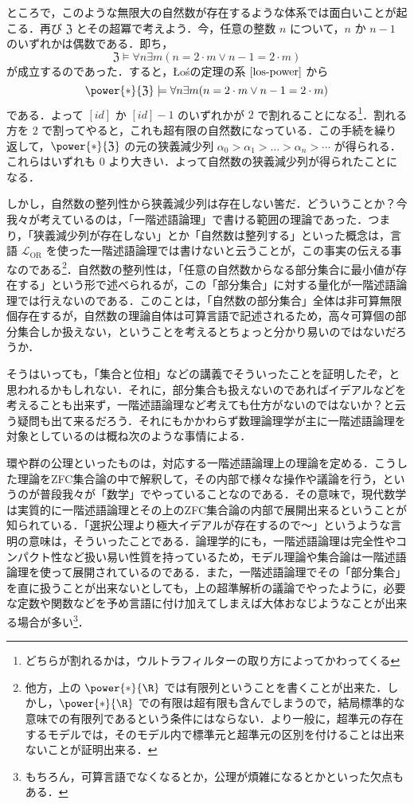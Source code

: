 \documentclass[a4j,xelatex,ja=standard]{ltjsarticle}
\newcommand{\Los}{{\L}o\'{s}}
\begin{document}
ところで，このような無限大の自然数が存在するような体系では面白いことが起こる．再び $\mathfrak{Z}$ とその超冪で考えよう．今，任意の整数 $n$ について，$n$ か $n-1$ のいずれかは偶数である．即ち，
\[
 \mathfrak{Z} \models \forall n \exists m (n = 2 \cdot m \vee n - 1 = 2\cdot m)
\]
が成立するのであった．すると，\Los の定理の系 $\ref{los-power}$ から
\[
 \power{*}{\mathfrak{Z}} \models \forall n \exists m (n = 2 \cdot m \vee n - 1 = 2\cdot m)
\]
である．よって $[id]$ か $[id]-1$ のいずれかが $2$ で割れることになる\footnote{どちらが割れるかは，ウルトラフィルターの取り方によってかわってくる}．割れる方を $2$ で割ってやると，これも超有限の自然数になっている．この手続を繰り返して，$\power{*}{\mathfrak{Z}}$ の元の狭義減少列 $\alpha_0 > \alpha_1 > \dots > \alpha_n > \cdots$ が得られる．これらはいずれも $0$ より大きい．よって自然数の狭義減少列が得られたことになる．

しかし，自然数の整列性から狭義減少列は存在しない筈だ．どういうことか？今我々が考えているのは，「一階述語論理」で書ける範囲の理論であった．つまり，「狭義減少列が存在しない」とか「自然数は整列する」といった概念は，言語 $\mathcal{L}_{\mathrm{OR}}$ を使った一階述語論理では書けないと云うことが，この事実の伝える事なのである\footnote{他方，上の $\power{*}{\R}$ では有限列ということを書くことが出来た．しかし，$\power{*}{\R}$ での有限は超有限も含んでしまうので，結局標準的な意味での有限列であるという条件にはならない．より一般に，超準元の存在するモデルでは，そのモデル内で標準元と超準元の区別を付けることは出来ないことが証明出来る．}．自然数の整列性は，「任意の自然数からなる部分集合に最小値が存在する」という形で述べられるが，この「部分集合」に対する量化が一階述語論理では行えないのである．このことは，「自然数の部分集合」全体は非可算無限個存在するが，自然数の理論自体は可算言語で記述されるため，高々可算個の部分集合しか扱えない，ということを考えるとちょっと分かり易いのではないだろうか．

そうはいっても，「集合と位相」などの講義でそういったことを証明したぞ，と思われるかもしれない．それに，部分集合も扱えないのであればイデアルなどを考えることも出来ず，一階述語論理など考えても仕方がないのではないか？と云う疑問も出て来るだろう．それにもかかわらず数理論理学が主に一階述語論理を対象としているのは概ね次のような事情による．

環や群の公理といったものは，対応する一階述語論理上の理論を定める．こうした理論をZFC集合論の中で解釈して，その内部で様々な操作や議論を行う，というのが普段我々が「数学」でやっていることなのである．その意味で，現代数学は実質的に一階述語論理とその上のZFC集合論の内部で展開出来るということが知られている．「選択公理より極大イデアルが存在するので〜」というような言明の意味は，そういったことである．論理学的にも，一階述語論理は完全性やコンパクト性など扱い易い性質を持っているため，モデル理論や集合論は一階述語論理を使って展開されているのである．また，一階述語論理でその「部分集合」を直に扱うことが出来ないとしても，上の超準解析の議論でやったように，必要な定数や関数などを予め言語に付け加えてしまえば大体おなじようなことが出来る場合が多い\footnote{もちろん，可算言語でなくなるとか，公理が煩雑になるとかといった欠点もある．}．
\end{document}
